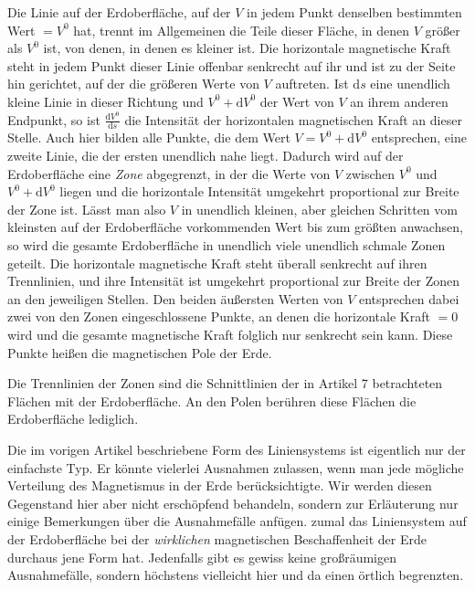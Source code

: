 Die Linie auf der Erdoberfläche, auf der $V$ in jedem Punkt denselben bestimmten Wert $=V^0$ hat, trennt im Allgemeinen die Teile dieser Fläche, in denen $V$ größer als $V^0$ ist, von denen, in denen es kleiner ist. Die horizontale magnetische Kraft steht in jedem Punkt dieser Linie offenbar senkrecht auf ihr und ist zu der Seite hin gerichtet, auf der die größeren Werte von $V$ auftreten. Ist $\mathrm{d}s$ eine unendlich kleine Linie in dieser Richtung und $V^0+\mathrm{d}V^0$ der Wert von $V$ an ihrem anderen Endpunkt, so ist $\frac{\mathrm{d}V^0}{\mathrm{d}s}$ die Intensität der horizontalen magnetischen Kraft an dieser Stelle. Auch hier bilden alle Punkte, die dem Wert $V=V^0+\mathrm{d}V^0$ entsprechen, eine zweite Linie, die der ersten unendlich nahe liegt. Dadurch wird auf der Erdoberfläche eine \textit{Zone} abgegrenzt, in der die Werte von $V$ zwischen $V^0$ und $V^0+\mathrm{d}V^0$ liegen und die horizontale Intensität umgekehrt proportional zur Breite der Zone ist. Lässt man also $V$ in unendlich kleinen, aber gleichen Schritten vom kleinsten auf der Erdoberfläche vorkommenden Wert bis zum größten anwachsen, so wird die gesamte Erdoberfläche in unendlich viele unendlich schmale Zonen geteilt. Die horizontale magnetische Kraft steht überall senkrecht auf ihren Trennlinien, und ihre Intensität ist umgekehrt proportional zur Breite der Zonen an den jeweiligen Stellen. Den beiden äußersten Werten von $V$ entsprechen dabei zwei von den Zonen eingeschlossene Punkte, an denen die horizontale Kraft $=0$ wird und die gesamte magnetische Kraft folglich nur senkrecht sein kann. Diese Punkte heißen die magnetischen Pole der Erde.

Die Trennlinien der Zonen sind die Schnittlinien der in Artikel 7 betrachteten Flächen mit der Erdoberfläche. An den Polen berühren diese Flächen die Erdoberfläche lediglich.

Die im vorigen Artikel beschriebene Form des Liniensystems ist eigentlich nur der einfachste Typ. Er könnte vielerlei Ausnahmen zulassen, wenn man jede mögliche Verteilung des Magnetismus in der Erde berücksichtigte. Wir werden diesen Gegenstand hier aber nicht erschöpfend behandeln, sondern zur Erläuterung nur einige Bemerkungen über die Ausnahmefälle anfügen. zumal das Liniensystem auf der Erdoberfläche bei der \textit{wirklichen} magnetischen Beschaffenheit der Erde durchaus jene Form hat. Jedenfalls gibt es gewiss keine großräumigen Ausnahmefälle, sondern höchstens vielleicht hier und da einen örtlich begrenzten.

